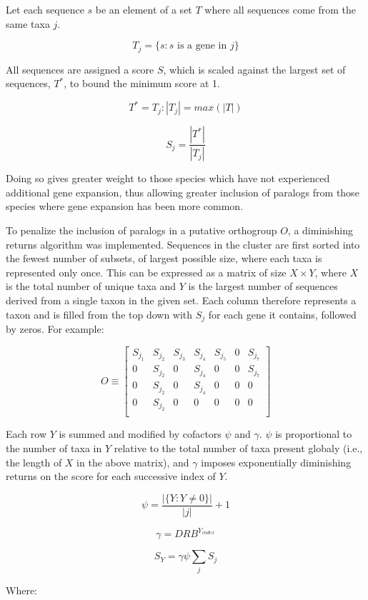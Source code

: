 \documentclass[twocolumn]{bmcart}%
\begin{document}
Let each sequence $s$ be an element of a set $T$ where all sequences come from the same taxa $j$.

\[ T_j = \{s:s \text{ is a gene in } j\} \]

All sequences are assigned a score $S$, which is scaled against the largest set of sequences, $T^*$, to bound the minimum score at 1.

\[ T^* = T_j:|T_j| = max(|T|) \]

\[ S_j = \frac{|T^*|}{|T_j|} \]

Doing so gives greater weight to those species which have not experienced additional gene expansion, thus allowing greater inclusion of paralogs from those species where gene expansion has been more common.

To penalize the inclusion of paralogs in a putative orthogroup $O$, a diminishing returns algorithm was implemented. Sequences in the cluster are first sorted into the fewest number of subsets, of largest possible size, where each taxa is represented only once. This can be expressed as a matrix of size $X \times Y$, where $X$ is the total number of unique taxa and $Y$ is the largest number of sequences derived from a single taxon in the given set. Each column therefore represents a taxon and is filled from the top down with $S_j$ for each gene it contains, followed by zeros. For example:


\[
O \equiv
\begin{bmatrix}
    S_{j_1} & S_{j_2} & S_{j_3} & S_{j_4} & S_{j_5} & 0 & S_{j_7}\\
    0 & S_{j_2} & 0 & S_{j_4} & 0 & 0 & S_{j_7} \\
    0 & S_{j_2} & 0 & S_{j_4} & 0 & 0 & 0 \\
    0 & S_{j_2} & 0 & 0 & 0 & 0 & 0 \\
\end{bmatrix}
\]

Each row $Y$ is summed and modified by cofactors $\psi$ and $\gamma$. $\psi$ is proportional to the number of taxa in $Y$ relative to the total number of taxa present globaly (i.e., the length of $X$ in the above matrix), and $\gamma$ imposes exponentially diminishing returns on the score for each successive index of $Y$.

\[ \psi = \frac{|\{Y:Y \neq 0\}|}{|j|} + 1 \]

\[ \gamma = DRB^{Y_{index}} \]

\[ S_Y = \gamma\psi\sum_{j} S_j \]

Where:
\end{document}
